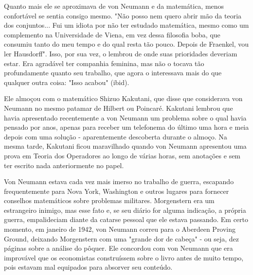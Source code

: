\documentclass[a4paper,12pt]{article}[abntex2]
\begin{document}
Quanto mais ele se aproximava de von Neumann e da matemática, menos confortável se sentia consigo mesmo. "Não posso nem quero abrir mão da teoria dos conjuntos... Fui um idiota por não ter estudado matemática, mesmo como um complemento na Universidade de Viena, em vez dessa filosofia boba, que consumiu tanto do meu tempo e do qual resta tão pouco. Depois de Fraenkel, vou ler Hausdorff". Isso, por sua vez, o lembrou de onde suas prioridades deveriam estar. Era agradável ter companhia feminina, mas não o tocava tão profundamente quanto seu trabalho, que agora o interessava mais do que qualquer outra coisa: "Isso acabou" (ibid).

Ele almoçou com o matemático Shizuo Kakutani, que disse que considerava von Neumann no mesmo patamar de Hilbert ou Poincaré. Kakutani lembrou que havia apresentado recentemente a von Neumann um problema sobre o qual havia pensado por anos, apenas para receber um telefonema do último uma hora e meia depois com uma solução - aparentemente descoberta durante o almoço. Na mesma tarde, Kakutani ficou maravilhado quando von Neumann apresentou uma prova em Teoria dos Operadores ao longo de várias horas, sem anotações e sem ter escrito nada anteriormente no papel.

Von Neumann estava cada vez mais imerso no trabalho de guerra, escapando frequentemente para Nova York, Washington e outros lugares para fornecer conselhos matemáticos sobre problemas militares. Morgenstern era um estrangeiro inimigo, mas esse fato e, se seu diário for alguma indicação, a própria guerra, empalideciam diante da catarse pessoal que ele estava passando. Em certo momento, em janeiro de 1942, von Neumann correu para o Aberdeen Proving Ground, deixando Morgenstern com uma "grande dor de cabeça" - ou seja, dez páginas sobre a análise do pôquer. Ele concordou com von Neumann que era improvável que os economistas construíssem sobre o livro antes de muito tempo, pois estavam mal equipados para absorver seu conteúdo.
\end{document}

